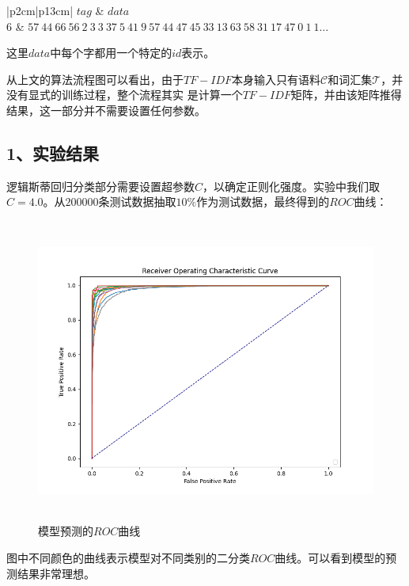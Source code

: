 \documentclass{article}
\begin{document}
\begin{tabular}{|p{2cm}|p{13cm}|} 
    \hline
    $tag$ & $data$ \\
    \hline
    $6$ & $57\ 44\ 66\ 56\ 2\ 3\ 3\ 37\ 5\ 41\ 9\ 57\ 44\ 47\ 45\ 33\ 13\ 63\ 58\ 31\ 17\ 47\ 0\ 1\ 1 \dots $\\
    \hline
 \end{tabular}

 这里$data$中每个字都用一个特定的$id$表示。
 
 从上文的算法流程图可以看出，由于$TF-IDF$本身输入只有语料$\mathcal{C}$和词汇集$\mathcal{T}$，并没有显式的训练过程，整个流程其实
 是计算一个$TF-IDF$矩阵，并由该矩阵推得结果，这一部分并不需要设置任何参数。

 \subsection*{1、实验结果}
 逻辑斯蒂回归分类部分需要设置超参数$C$，以确定正则化强度。实验中我们取$C=4.0$。从$200000$条测试数据抽取$10\%$作为测试数据，最终得到的$ROC$曲线：
 \begin{figure}[H]
    \centering
    \begin{minipage}[t]{1.0\linewidth}
        \centering
        \includegraphics[height=10cm]{Figure_1.png}
        \caption{模型预测的$ROC$曲线}
    \end{minipage}
 \end{figure}
 图中不同颜色的曲线表示模型对不同类别的二分类$ROC$曲线。可以看到模型的预测结果非常理想。
\end{document}
